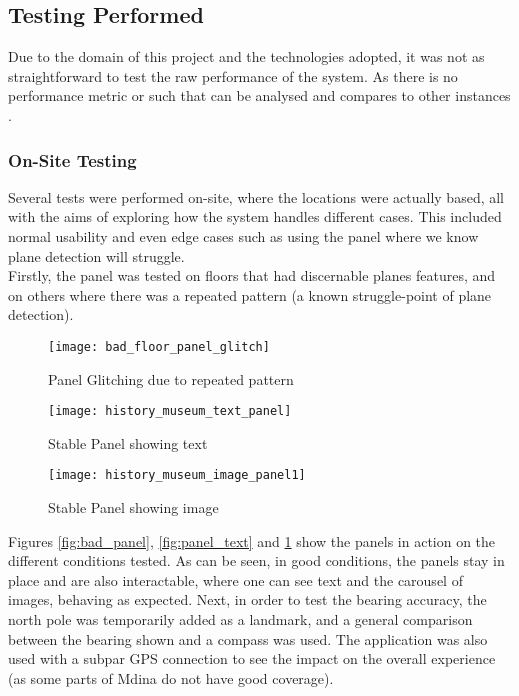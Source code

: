 \subsection{Testing Performed}
Due to the domain of this project and the technologies adopted, it was not as straightforward to 
test the raw performance of the system. As there is no performance metric or such that can be 
analysed and compares to other instances \cite{Samini2017}. 
\subsubsection{On-Site Testing}
Several tests were performed on-site, where the locations were actually based, all with the aims of exploring how the system handles different cases. 
This included normal usability and even edge cases such as using the panel where we know plane detection will struggle.
\\
Firstly, the panel was tested on floors that had discernable planes features, and on others where there was a repeated pattern (a known struggle-point of plane detection).\\
\begin{figure}[!htb]
        \texttt{[image: bad\_floor\_panel\_glitch]}
            \caption{Panel Glitching due to repeated pattern}
            \label{fig:bad_panel}
    \endminipage\hfill
        \texttt{[image: history\_museum\_text\_panel]}
        \caption{Stable Panel showing text}
        \label{fig:panel_text}
    \endminipage\hfill
        \texttt{[image: history\_museum\_image\_panel1]}
        \caption{Stable Panel showing image}
        \label{fig:panel_img}
    \endminipage
    \end{figure}

\noindent
Figures \ref{fig:bad_panel}, \ref{fig:panel_text} and \ref{fig:panel_img}
show the panels in action on the different conditions tested. As can be seen, in good conditions, the panels stay in place 
and are also interactable, where one can see text and the carousel of images, behaving as expected.
Next, in order to test the bearing accuracy, the north pole was temporarily added as a landmark, and a general comparison between the bearing shown and a compass was used.
The application was also used with a subpar GPS connection to see the impact on the overall experience (as some parts of Mdina do not have good coverage).

